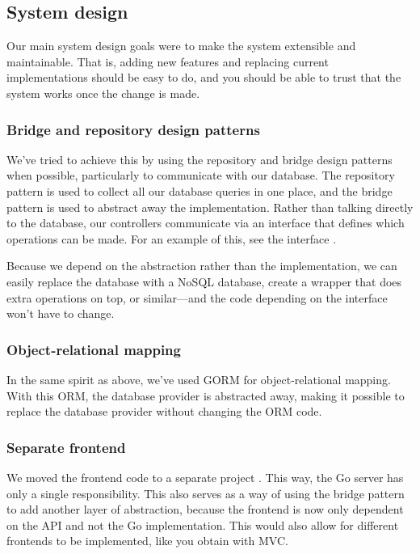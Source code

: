 \subsection{System design}
\label{section:system-design}
Our main system design goals were to make the system extensible and maintainable. That is, adding new features and replacing current implementations should be easy to do, and you should be able to trust that the system works once the change is made.

\subsubsection{Bridge and repository design patterns}
We've tried to achieve this by using the repository and bridge design patterns when possible, particularly to communicate with our database. The repository pattern is used to collect all our database queries in one place, and the bridge pattern is used to abstract away the implementation. Rather than talking directly to the database, our controllers communicate via an interface that defines which operations can be made. For an example of this, see the  interface \cite{repo:user-repository-interface}.

Because we depend on the abstraction rather than the implementation, we can easily replace the database with a NoSQL database, create a wrapper that does extra operations on top, or similar---and the code depending on the interface won't have to change.

\subsubsection{Object-relational mapping}
In the same spirit as above, we've used GORM \cite{gorm} for object-relational mapping. With this ORM, the database provider is abstracted away, making it possible to replace the database provider without changing the ORM code.

\subsubsection{Separate frontend}
We moved the frontend code to a separate project \cite{repo:frontend}. This way, the Go server has only a single responsibility. This also serves as a way of using the bridge pattern to add another layer of abstraction, because the frontend is now only dependent on the API and not the Go implementation. This would also allow for different frontends to be implemented, like you obtain with MVC.

